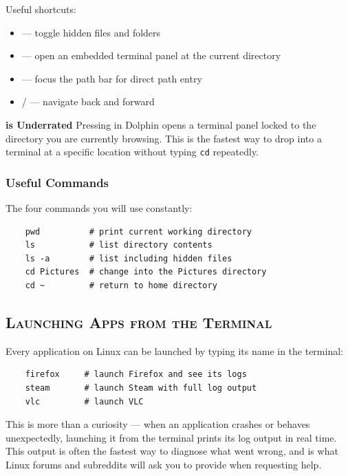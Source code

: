 \documentclass{article}
\newcommand{\code}[1]{\colorbox{codebg}{\texttt{#1}}}
\begin{document}
Useful shortcuts:

\begin{itemize}[leftmargin=1.5em, nosep, label={\tiny\textbullet}]
	\item {} --- toggle hidden files and folders
	\item {} --- open an embedded terminal panel at the current directory
	\item {} --- focus the path bar for direct path entry
	\item {} /  --- navigate back and forward
\end{itemize}

\begin{callout}{\textbf{ is Underrated}}
	Pressing  in Dolphin opens a terminal panel locked to the directory you
	are currently browsing. This is the fastest way to drop into a terminal at a
	specific location without typing \code{cd} repeatedly.
\end{callout}

\subsubsection{Useful Commands}

The four commands you will use constantly:

\begin{verbatim}
	pwd          # print current working directory
	ls           # list directory contents
	ls -a        # list including hidden files
	cd Pictures  # change into the Pictures directory
	cd ~         # return to home directory
\end{verbatim}

\subsection{\textsc{Launching Apps from the Terminal}}

Every application on Linux can be launched by typing its name in the terminal:

\begin{verbatim}
	firefox     # launch Firefox and see its logs
	steam       # launch Steam with full log output
	vlc         # launch VLC
\end{verbatim}

This is more than a curiosity --- when an application crashes or behaves unexpectedly,
launching it from the terminal prints its log output in real time. This output is
often the fastest way to diagnose what went wrong, and is what Linux forums and
subreddits will ask you to provide when requesting help.
\newpage
\end{document}
